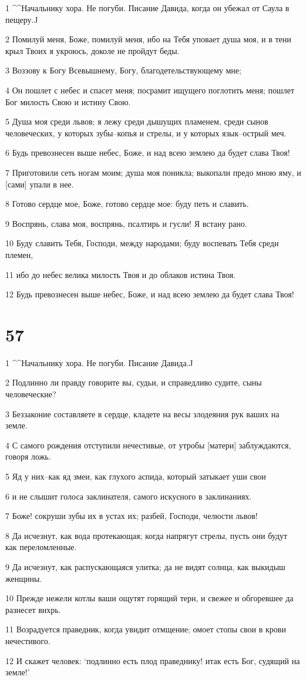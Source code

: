 \par 1 ^^Начальнику хора. Не погуби. Писание Давида, когда он убежал от Саула в пещеру.^^
\par 2 Помилуй меня, Боже, помилуй меня, ибо на Тебя уповает душа моя, и в тени крыл Твоих я укроюсь, доколе не пройдут беды.
\par 3 Воззову к Богу Всевышнему, Богу, благодетельствующему мне;
\par 4 Он пошлет с небес и спасет меня; посрамит ищущего поглотить меня; пошлет Бог милость Свою и истину Свою.
\par 5 Душа моя среди львов; я лежу среди дышущих пламенем, среди сынов человеческих, у которых зубы--копья и стрелы, и у которых язык--острый меч.
\par 6 Будь превознесен выше небес, Боже, и над всею землею да будет слава Твоя!
\par 7 Приготовили сеть ногам моим; душа моя поникла; выкопали предо мною яму, и [сами] упали в нее.
\par 8 Готово сердце мое, Боже, готово сердце мое: буду петь и славить.
\par 9 Воспрянь, слава моя, воспрянь, псалтирь и гусли! Я встану рано.
\par 10 Буду славить Тебя, Господи, между народами; буду воспевать Тебя среди племен,
\par 11 ибо до небес велика милость Твоя и до облаков истина Твоя.
\par 12 Будь превознесен выше небес, Боже, и над всею землею да будет слава Твоя!

\chapter{57}

\par 1 ^^Начальнику хора. Не погуби. Писание Давида.^^
\par 2 Подлинно ли правду говорите вы, судьи, и справедливо судите, сыны человеческие?
\par 3 Беззаконие составляете в сердце, кладете на весы злодеяния рук ваших на земле.
\par 4 С самого рождения отступили нечестивые, от утробы [матери] заблуждаются, говоря ложь.
\par 5 Яд у них--как яд змеи, как глухого аспида, который затыкает уши свои
\par 6 и не слышит голоса заклинателя, самого искусного в заклинаниях.
\par 7 Боже! сокруши зубы их в устах их; разбей, Господи, челюсти львов!
\par 8 Да исчезнут, как вода протекающая; когда напрягут стрелы, пусть они будут как переломленные.
\par 9 Да исчезнут, как распускающаяся улитка; да не видят солнца, как выкидыш женщины.
\par 10 Прежде нежели котлы ваши ощутят горящий терн, и свежее и обгоревшее да разнесет вихрь.
\par 11 Возрадуется праведник, когда увидит отмщение; омоет стопы свои в крови нечестивого.
\par 12 И скажет человек: `подлинно есть плод праведнику! итак есть Бог, судящий на земле!'

